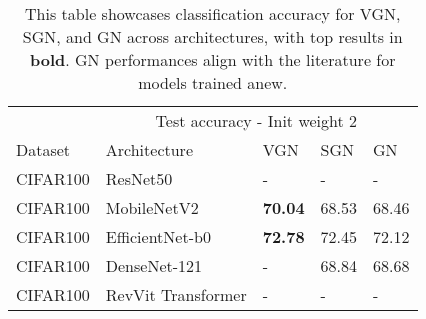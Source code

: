\begin{table}
  \caption{This table showcases classification accuracy for VGN, SGN, and GN across architectures, with top results in \textbf{bold}. GN performances align with the literature for models trained anew.}
  \label{classification results - Init weight 2}
  \centering
  \begin{tabular}{lllll}
    \toprule
    \multicolumn{4}{r}{Test accuracy - Init weight 2}                   \\
    \cmidrule(r){3-5}
    Dataset     & Architecture     & VGN & SGN & GN \\
    \midrule
    CIFAR100 & ResNet50  & - & - & -    \\
    CIFAR100 & MobileNetV2  & \textbf{70.04} & 68.53 & 68.46 \\
    CIFAR100 & EfficientNet-b0  & \textbf{72.78} & 72.45 & 72.12    \\
    CIFAR100 & DenseNet-121  & - & 68.84 & 68.68    \\
    CIFAR100 & RevVit Transformer  & - & - & -    \\
    \bottomrule
  \end{tabular}
\end{table}